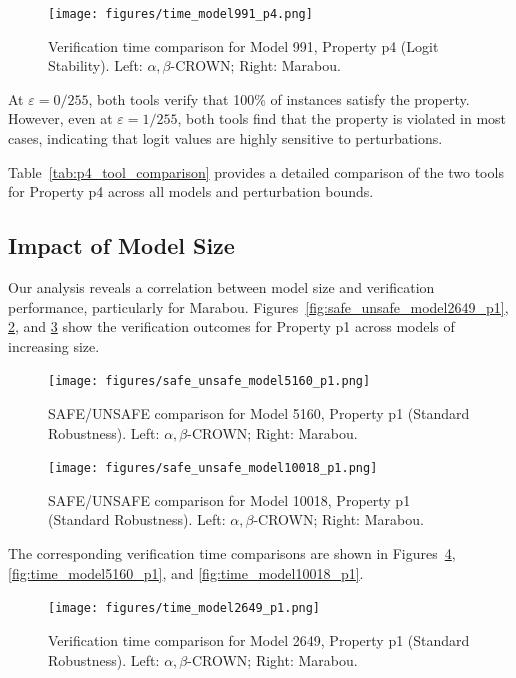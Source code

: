 \begin{figure}[htbp]
    \centering
    \texttt{[image: figures/time\_model991\_p4.png]}
    \caption{Verification time comparison for Model 991, Property p4 (Logit Stability). Left: $\alpha, \beta$-CROWN; Right: Marabou.}
    \label{fig:time_model991_p4}
\end{figure}

At $\varepsilon = 0/255$, both tools verify that 100\% of instances satisfy the property. However, even at $\varepsilon = 1/255$, both tools find that the property is violated in most cases, indicating that logit values are highly sensitive to perturbations.

Table~\ref{tab:p4_tool_comparison} provides a detailed comparison of the two tools for Property p4 across all models and perturbation bounds.



\subsection{Impact of Model Size}

Our analysis reveals a correlation between model size and verification performance, particularly for Marabou. Figures~\ref{fig:safe_unsafe_model2649_p1}, \ref{fig:safe_unsafe_model5160_p1}, and \ref{fig:safe_unsafe_model10018_p1} show the verification outcomes for Property p1 across models of increasing size.

\begin{figure}[htbp]
    \centering
    \texttt{[image: figures/safe\_unsafe\_model5160\_p1.png]}
    \caption{SAFE/UNSAFE comparison for Model 5160, Property p1 (Standard Robustness). Left: $\alpha, \beta$-CROWN; Right: Marabou.}
    \label{fig:safe_unsafe_model5160_p1}
\end{figure}

\begin{figure}[htbp]
    \centering
    \texttt{[image: figures/safe\_unsafe\_model10018\_p1.png]}
    \caption{SAFE/UNSAFE comparison for Model 10018, Property p1 (Standard Robustness). Left: $\alpha, \beta$-CROWN; Right: Marabou.}
    \label{fig:safe_unsafe_model10018_p1}
\end{figure}

The corresponding verification time comparisons are shown in Figures~\ref{fig:time_model2649_p1}, \ref{fig:time_model5160_p1}, and \ref{fig:time_model10018_p1}.

\begin{figure}[htbp]
    \centering
    \texttt{[image: figures/time\_model2649\_p1.png]}
    \caption{Verification time comparison for Model 2649, Property p1 (Standard Robustness). Left: $\alpha, \beta$-CROWN; Right: Marabou.}
    \label{fig:time_model2649_p1}
\end{figure}

